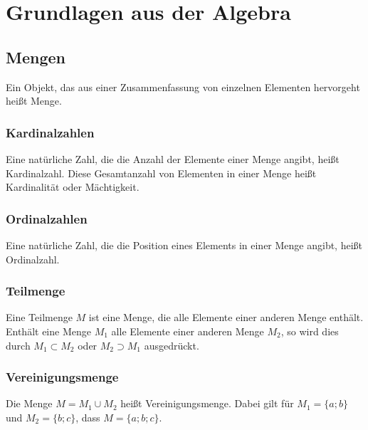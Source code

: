 \section{Grundlagen aus der Algebra}
\subsection{Mengen}
\begin{definition}
    Ein Objekt, das aus einer Zusammenfassung von einzelnen Elementen hervorgeht heißt Menge.
\end{definition}

\subsubsection{Kardinalzahlen}
\begin{definition}
    Eine natürliche Zahl, die die Anzahl der Elemente einer Menge angibt, heißt Kardinalzahl. Diese Gesamtanzahl von Elementen in einer Menge heißt Kardinalität oder Mächtigkeit.
\end{definition}

\subsubsection{Ordinalzahlen}
\begin{definition}
    Eine natürliche Zahl, die die Position eines Elements in einer Menge angibt, heißt Ordinalzahl.
\end{definition}

\subsubsection{Teilmenge}
\begin{definition}
    Eine Teilmenge $M$ ist eine Menge, die alle Elemente einer anderen Menge enthält. Enthält eine Menge $M_1$ alle Elemente einer anderen Menge $M_2$, so wird dies durch $M_1 \subset M_2$ oder $M_2 \supset M_1$ ausgedrückt.
\end{definition}

\subsubsection{Vereinigungsmenge}
\begin{definition}
    Die Menge $M = M_1 \cup M_2$ heißt Vereinigungsmenge. Dabei gilt für $M_1 = \{a;b\}$ und $M_2 = \{b;c\}$, dass $M = \{a;b;c\}$.
\end{definition}

